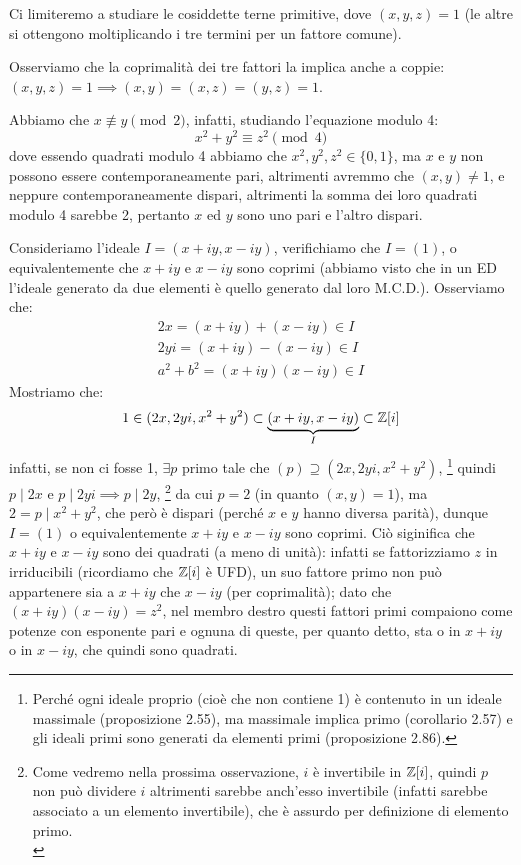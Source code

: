 \documentclass[11pt]{scrartcl}
\begin{document}
Ci limiteremo a studiare le cosiddette terne primitive, dove $(x,y,z) = 1$ (le altre si ottengono moltiplicando i tre termini per un fattore comune).

\begin{remark}
    Osserviamo che la coprimalità dei tre fattori la implica anche a coppie: $(x,y,z) = 1 \implies (x,y) = (x,z) = (y,z) = 1$.
\end{remark}

\begin{remark}
    Abbiamo che $x \not\equiv y \pmod 2$, infatti, studiando l'equazione modulo 4:
    \[ x^2 + y^2 \equiv z^2 \pmod 4
        \]
    dove essendo quadrati modulo 4 abbiamo che $x^2, y^2, z^2 \in \{0,1\}$, ma $x$ e $y$ non possono essere contemporaneamente pari,
    altrimenti avremmo che $(x,y) \ne 1$, e neppure contemporaneamente dispari, altrimenti la somma dei loro quadrati modulo 4 sarebbe 2,
    pertanto $x$ ed $y$ sono uno pari e l'altro dispari.
\end{remark}

\begin{remark}
    Consideriamo l'ideale $I = (x+iy, x-iy)$, verifichiamo che $I = (1)$, o equivalentemente che $x+iy$ e $x-iy$ sono coprimi 
    (abbiamo visto che in un ED l'ideale generato da due elementi è quello generato dal loro M.C.D.). Osserviamo che:
    \begin{align*}
        2x = (x+iy) + (x-iy) \in I \\
        2yi = (x+iy) - (x-iy) \in I \\
	a^2 + b^2 = (x+iy)(x-iy) \in I
    \end{align*} 
    Mostriamo che:
    \[ 1 \in (2x, 2yi, x^2+y^2) \subset \underbrace{(x+iy,x-iy)}_{I} \subset \mathbb Z[i]
        \]
    infatti, se non ci fosse 1, $\exists p$ primo tale che $(p) \supseteq (2x, 2yi, x^2+y^2)$,
    \footnote{Perché ogni ideale proprio (cioè che non contiene 1) è contenuto in un ideale massimale (proposizione 2.55), ma massimale implica primo (corollario 2.57) e gli ideali primi sono generati da elementi primi (proposizione 2.86).}
    quindi $p \mid 2x$ e $p \mid 2yi \implies p \mid 2y$, 
    \footnote{Come vedremo nella prossima osservazione, $i$ è invertibile in $\mathbb Z[i]$, quindi $p$ non può dividere $i$ altrimenti sarebbe anch'esso invertibile (infatti sarebbe associato a un elemento invertibile), che è assurdo per definizione di elemento primo. \\
    [In realtà si poteva considerare direttamente l'ideale $(2x, 2y, x^2+y^2)$ in quanto $2y = (2yi)i^3 \in I$ perché $2yi \in I$]}
    da cui $p = 2$ (in quanto $(x,y) = 1$), 
    ma $2 = p \mid x^2+y^2$, che però è dispari (perché $x$ e $y$ hanno diversa parità), 
    dunque $I = (1)$ o equivalentemente $x+iy$ e $x-iy$ sono coprimi. 
    Ciò siginifica che $x+iy$ e $x-iy$ sono dei quadrati (a meno di unità): 
    infatti se fattorizziamo $z$ in irriducibili (ricordiamo che $\mathbb Z[i]$ è UFD), 
    un suo fattore primo non può appartenere sia a $x+iy$ che $x-iy$ (per coprimalità); 
    dato che $(x+iy)(x-iy) = z^2$, nel membro destro questi fattori primi compaiono come potenze con esponente pari 
    e ognuna di queste, per quanto detto, sta o in $x+iy$ o in $x-iy$, che quindi sono quadrati.
\end{remark}
\end{document}

